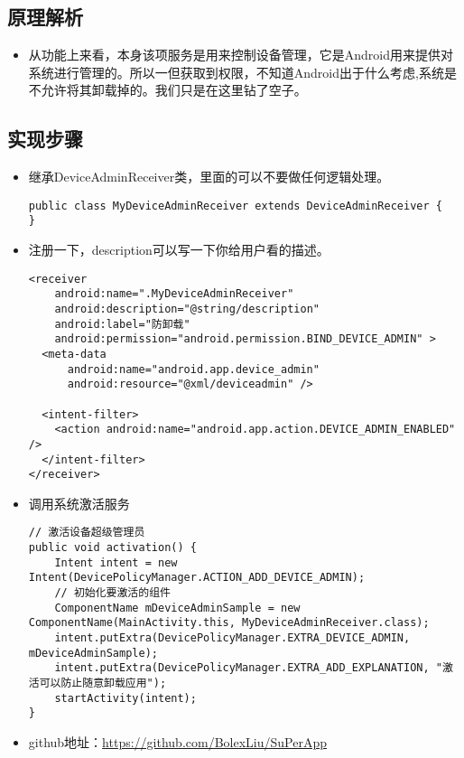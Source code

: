 \documentclass[9pt, b5paper]{article}
\begin{document}
\subsection{原理解析}
\label{sec-2-2}
\begin{itemize}
\item 从功能上来看，本身该项服务是用来控制设备管理，它是Android用来提供对系统进行管理的。所以一但获取到权限，不知道Android出于什么考虑,系统是不允许将其卸载掉的。我们只是在这里钻了空子。
\end{itemize}
\subsection{实现步骤}
\label{sec-2-3}
\begin{itemize}
\item 继承DeviceAdminReceiver类，里面的可以不要做任何逻辑处理。
\begin{verbatim}
public class MyDeviceAdminReceiver extends DeviceAdminReceiver {
}
\end{verbatim}
\item 注册一下，description可以写一下你给用户看的描述。
\begin{verbatim}
<receiver
    android:name=".MyDeviceAdminReceiver"
    android:description="@string/description"
    android:label="防卸载"
    android:permission="android.permission.BIND_DEVICE_ADMIN" >
  <meta-data
      android:name="android.app.device_admin"
      android:resource="@xml/deviceadmin" />

  <intent-filter>
    <action android:name="android.app.action.DEVICE_ADMIN_ENABLED" />
  </intent-filter>
</receiver>
\end{verbatim}
\item 调用系统激活服务
\begin{verbatim}
// 激活设备超级管理员
public void activation() {
    Intent intent = new Intent(DevicePolicyManager.ACTION_ADD_DEVICE_ADMIN);
    // 初始化要激活的组件
    ComponentName mDeviceAdminSample = new ComponentName(MainActivity.this, MyDeviceAdminReceiver.class);
    intent.putExtra(DevicePolicyManager.EXTRA_DEVICE_ADMIN, mDeviceAdminSample);
    intent.putExtra(DevicePolicyManager.EXTRA_ADD_EXPLANATION, "激活可以防止随意卸载应用");
    startActivity(intent);
}
\end{verbatim}
\item github地址：\url{https://github.com/BolexLiu/SuPerApp}
\end{itemize}
\end{document}
